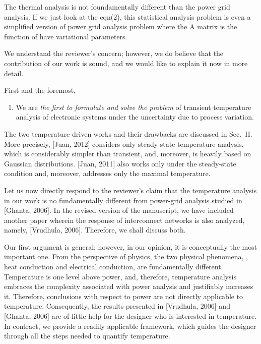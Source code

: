 \begin{reviewer}
The thermal analysis is not foundamentally different than the power grid analysis.  If we just look at the eqn(2), this statistical analysis problem is even a simplified version of power grid analysis problem where the A matrix is the function of have variational parameters.
\end{reviewer}
\begin{authors}
We understand the reviewer's concern; however, we do believe that the contribution of our work is sound, and we would like to explain it now in more detail.

First and the foremost,
\begin{enumerate}
  \item We are \emph{the first to formulate and solve the problem} of transient temperature analysis of electronic systems under the uncertainty due to process variation.
\end{enumerate}
The two temperature-driven works and their drawbacks are discussed in Sec.~II.
More precisely, [Juan, 2012] considers only steady-state temperature analysis, which is considerably simpler than transient, and, moreover, is heavily based on Gaussian distributions.
[Juan, 2011] also works only under the steady-state condition and, moreover, addresses only the maximal temperature.

Let us now directly respond to the reviewer's claim that the temperature analysis in our work is no fundamentally different from power-grid analysis studied in [Ghanta, 2006].
In the revised version of the manuscript, we have included another paper wherein the response of interconnect networks is also analyzed, namely, [Vrudhula, 2006].
Therefore, we shall discuss both.

Our first argument is general; however, in our opinion, it is conceptually the most important one.
From the perspective of physics, the two physical phenomena, \ie, heat conduction and electrical conduction, are fundamentally different.
Temperature is one level above power, and, therefore, temperature analysis embraces the complexity associated with power analysis and justifiably increases it.
Therefore, conclusions with respect to power are not directly applicable to temperature.
Consequently, the results presented in [Vrudhula, 2006] and [Ghanta, 2006] are of little help for the designer who is interested in temperature.
In contract, we provide a readily applicable framework, which guides the designer through all the steps needed to quantify temperature.


\end{authors}
